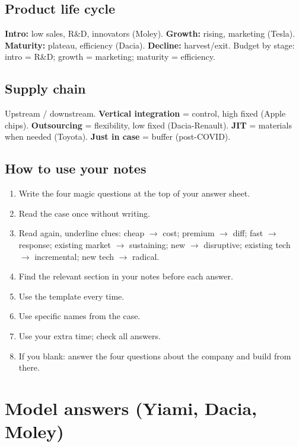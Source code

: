 \documentclass[8pt,a4paper]{article}
\begin{document}
\subsection*{Product life cycle}
\textbf{Intro:} low sales, R\&D, innovators (Moley). \textbf{Growth:} rising, marketing (Tesla). \textbf{Maturity:} plateau, efficiency (Dacia). \textbf{Decline:} harvest/exit. Budget by stage: intro = R\&D; growth = marketing; maturity = efficiency.

\subsection*{Supply chain}
Upstream / downstream. \textbf{Vertical integration} = control, high fixed (Apple chips). \textbf{Outsourcing} = flexibility, low fixed (Dacia-Renault). \textbf{JIT} = materials when needed (Toyota). \textbf{Just in case} = buffer (post-COVID).

\subsection*{How to use your notes}
\begin{enumerate}
\item Write the four magic questions at the top of your answer sheet.
\item Read the case once without writing.
\item Read again, underline clues: cheap $\to$ cost; premium $\to$ diff; fast $\to$ response; existing market $\to$ sustaining; new $\to$ disruptive; existing tech $\to$ incremental; new tech $\to$ radical.
\item Find the relevant section in your notes before each answer.
\item Use the template every time.
\item Use specific names from the case.
\item Use your extra time; check all answers.
\item If you blank: answer the four questions about the company and build from there.
\end{enumerate}

\vspace{0.8em}
\newpage

\section*{\color{eublue}Model answers (Yiami, Dacia, Moley)}
\end{document}
